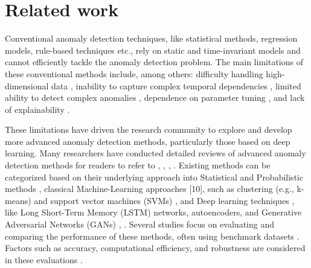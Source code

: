 \documentclass[conference]{IEEEtran}
\begin{document}
\section{Related work}
\label{sec:bg}

Conventional anomaly detection techniques, like statistical methods, regression models, rule-based techniques etc., rely on static and time-invariant models and cannot efficiently tackle the anomaly detection problem. The main limitations of these conventional methods include, among others: difficulty handling high-dimensional data \cite{s23052844}, inability to capture complex temporal dependencies \cite{8926446}, limited ability to detect complex anomalies \cite{DBLP:journals/corr/abs-2004-00433}, dependence on parameter tuning \cite{s23052844}, and lack of explainability \cite{HILAL2022116429}.

These limitations have driven the research community to explore and develop more advanced anomaly detection methods, particularly those based on deep learning. Many researchers have conducted detailed reviews of advanced anomaly detection methods for readers to refer to \cite{8926446}, \cite{9523565}, \cite{10.14778/3538598.3538602}, \cite{MEJRI2024124922}. Existing methods can be categorized based on their underlying approach into Statistical and Probabilistic methods \cite{SGUEGLIA2022170},  
classical Machine-Learning approaches [10], such as clustering (e.g., k-means) and support vector machines (SVMs) \cite{9523565},
and Deep learning techniques \cite{8079887}, 
like Long Short-Term Memory (LSTM) networks, autoencoders, and Generative Adversarial Networks (GANs) \cite{8926446}, \cite{10.14778/3538598.3538602}.
Several studies focus on evaluating and comparing the performance of these methods, often using benchmark datasets \cite{MEJRI2024124922}. Factors such as accuracy, computational efficiency, and robustness are considered in these evaluations \cite{DBLP:journals/corr/abs-2004-00433}.
\end{document}
